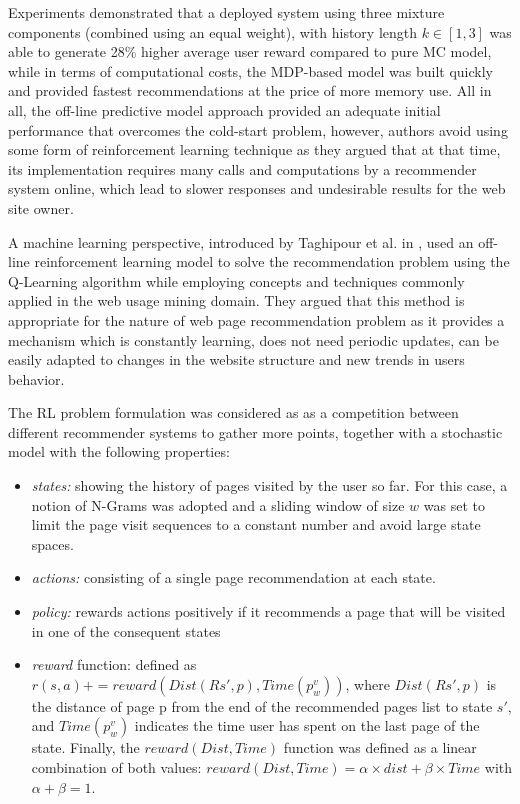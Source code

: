 Experiments demonstrated that a deployed system using three mixture components (combined using an equal weight), with history length $k \in [1,3]$ was able to generate 28\% higher average user reward compared to pure MC model, while in terms of computational costs, the MDP-based model was built quickly and provided fastest recommendations at the price of more memory use. All in all, the off-line predictive model approach provided an adequate initial performance that overcomes the cold-start problem, however, authors avoid using some form of reinforcement learning technique as they argued that at that time, its implementation requires many calls and computations by a recommender system online, which lead to slower responses and undesirable results for the web site owner.

A machine learning perspective, introduced by Taghipour et al. in \cite{taghipour2007usage}, used an off-line reinforcement learning model to solve the recommendation problem using the Q-Learning algorithm while employing concepts and techniques commonly applied in the web usage mining domain. They argued that this method is appropriate for the nature of web page recommendation problem as it provides a mechanism which is constantly learning, does not need periodic updates, can be easily adapted to changes in the website structure and new trends in users behavior.

The RL problem formulation was considered as as a competition between different recommender systems to gather more points, 
together with a stochastic model with the following properties: 

\begin{itemize}
\item \textit{states:} showing the history of pages visited by the user so far. For this case, a notion of N-Grams was adopted and a sliding window of size $w$ was set to limit the page visit sequences to a constant number and avoid large state spaces.
\item \textit{actions:} consisting of a single page recommendation at each state.
\item \textit{policy:} rewards actions positively if it recommends a page that will be visited in one of the consequent states
\item \textit{reward} function: defined as $r(s, a) += reward(Dist(Rs', p), Time(p^v_w))$, where $Dist(Rs', p)$ is the distance of page p from the end of the recommended pages list to state $s'$, and $Time(p^v_w)$ indicates the time user has spent on the last page of the state. Finally, the $reward(Dist, Time)$ function was defined as a linear combination of both values: $reward(Dist,  Time) = \alpha \times dist + \beta \times Time$ with $\alpha + \beta = 1$.
\end{itemize}

